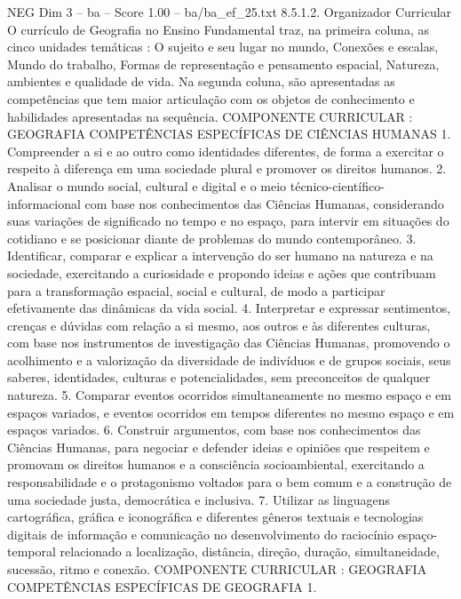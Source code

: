\begin{textsample}{NEG Dim 3 – ba – Score 1.00 – ba/ba\_ef\_25.txt}  \label{ex:f3_neg_116}
8.5.1.2.
Organizador Curricular O currículo de Geografia no Ensino Fundamental traz, na primeira coluna, as cinco unidades temáticas : O sujeito e seu lugar no mundo, Conexões e escalas, Mundo do trabalho, Formas de representação e pensamento espacial, Natureza, ambientes e qualidade de vida.
Na segunda coluna, são apresentadas as competências que tem maior articulação com os objetos de conhecimento e habilidades apresentadas na sequência.
COMPONENTE CURRICULAR : GEOGRAFIA COMPETÊNCIAS ESPECÍFICAS DE CIÊNCIAS HUMANAS 1.
Compreender a si e ao outro como identidades diferentes, de forma a exercitar o respeito à diferença em uma sociedade plural e promover os direitos humanos. 2.
Analisar o mundo social, cultural e digital e o meio técnico-científico-informacional com base nos conhecimentos das Ciências Humanas, considerando suas variações de significado no tempo e no espaço, para intervir em situações do cotidiano e se posicionar diante de problemas do mundo contemporâneo. 3.
Identificar, comparar e explicar a intervenção do ser humano na natureza e na sociedade, exercitando a curiosidade e propondo ideias e ações que contribuam para a transformação espacial, social e cultural, de modo a participar efetivamente das dinâmicas da vida social. 4.
Interpretar e expressar sentimentos, crenças e dúvidas com relação a si mesmo, aos outros e às diferentes culturas, com base nos instrumentos de investigação das Ciências Humanas, promovendo o acolhimento e a valorização da diversidade de indivíduos e de grupos sociais, seus saberes, identidades, culturas e potencialidades, sem preconceitos de qualquer natureza. 5.
Comparar eventos ocorridos simultaneamente no mesmo espaço e em espaços variados, e eventos ocorridos em tempos diferentes no mesmo espaço e em espaços variados. 6.
Construir argumentos, com base nos conhecimentos das Ciências Humanas, para negociar e defender ideias e opiniões que respeitem e promovam os direitos humanos e a consciência socioambiental, exercitando a responsabilidade e o protagonismo voltados para o bem comum e a construção de uma sociedade justa, democrática e inclusiva. 7.
Utilizar as linguagens cartográfica, gráfica e iconográfica e diferentes gêneros textuais e tecnologias digitais de informação e comunicação no desenvolvimento do raciocínio espaço-temporal relacionado a localização, distância, direção, duração, simultaneidade, sucessão, ritmo e conexão.
COMPONENTE CURRICULAR : GEOGRAFIA COMPETÊNCIAS ESPECÍFICAS DE GEOGRAFIA 1.

\end{textsample}
